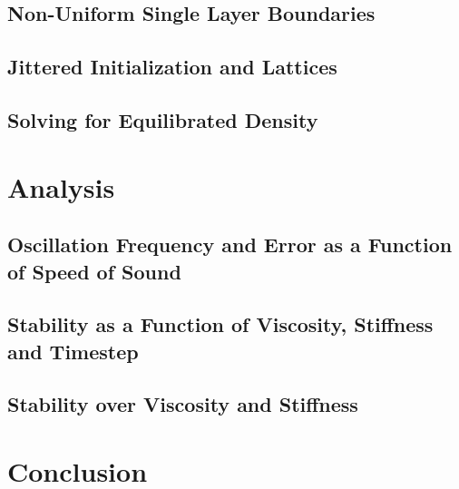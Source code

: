 \documentclass[oneside, a4paper]{book}
\begin{document}
\section{Non-Uniform Single Layer Boundaries}
\section{Jittered Initialization and Lattices}
\section{Solving for Equilibrated Density}


\chapter{Analysis}
\section{Oscillation Frequency and Error as a Function of Speed of Sound}
\section{Stability as a Function of Viscosity, Stiffness and Timestep}
\section{Stability over Viscosity and Stiffness}

\chapter{Conclusion}



\printbibliography[
  heading=bibintoc,
  title={Bibliography}
]
\end{document}
